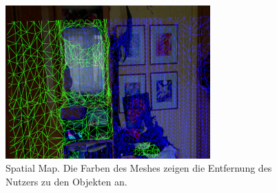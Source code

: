\begin{figure}[H]
	\centering
	\includegraphics[width=0.7\textwidth]{images/ML_20201003_15.36.42.jpg}
	\caption[]{Spatial Map. Die Farben des Meshes zeigen die Entfernung des Nutzers zu den Objekten an.}
	\label{img:spatialmap}
\end{figure}


%
%
%


